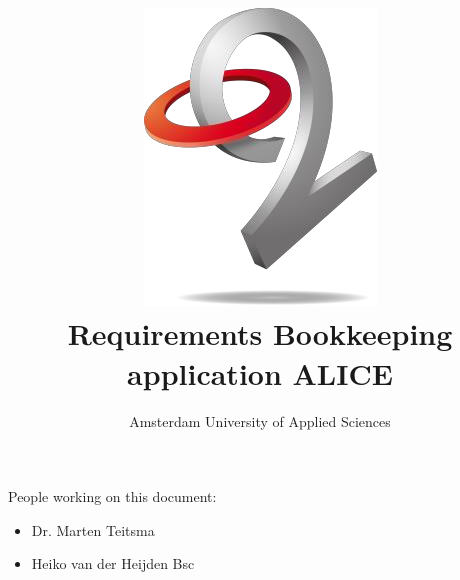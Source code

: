 \documentclass[a4paper,11pt]{book}
\title{\includegraphics{./images/o2.png}\\Requirements Bookkeeping application ALICE}
\author{Amsterdam University of Applied Sciences}
\begin{document}
\maketitle
People working on this document:
\begin{itemize}
  \item Dr. Marten Teitsma
  \item Heiko van der Heijden Bsc
\end{itemize}


\tableofcontents




\end{document}
